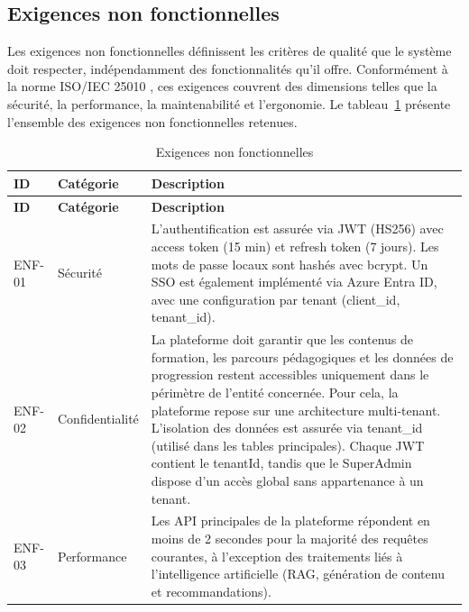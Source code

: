 \subsection{Exigences non fonctionnelles}

Les exigences non fonctionnelles définissent les critères de qualité que le système 
doit respecter, indépendamment des fonctionnalités qu'il offre. Conformément à la 
norme ISO/IEC 25010 \cite{iso25010}, ces exigences couvrent des dimensions telles 
que la sécurité, la performance, la maintenabilité et l'ergonomie. Le 
tableau~\ref{tab:enf} présente l'ensemble des exigences non fonctionnelles retenues.

\renewcommand{\arraystretch}{1.3}

\begin{longtable}{|p{1.2cm}|p{2.8cm}|p{11cm}|}

\caption{Exigences non fonctionnelles}
\label{tab:enf} \\

\hline
\textbf{ID} & \textbf{Catégorie} & \textbf{Description} \\
\hline
\endfirsthead

\hline
\textbf{ID} & \textbf{Catégorie} & \textbf{Description} \\
\hline
\endhead

ENF-01 & Sécurité & L'authentification est assurée via JWT (HS256) avec access token (15 min) et refresh token (7 jours). Les mots de passe locaux sont hashés avec bcrypt. Un SSO est également implémenté via Azure Entra ID, avec une configuration par tenant (client\_id, tenant\_id). \\
\hline

ENF-02 & Confidentialité & La plateforme doit garantir que les contenus de formation, les parcours pédagogiques et les données de progression restent accessibles uniquement dans le périmètre de l'entité concernée. Pour cela, la plateforme repose sur une architecture multi-tenant. L'isolation des données est assurée via tenant\_id (utilisé dans les tables principales). Chaque JWT contient le tenantId, tandis que le SuperAdmin dispose d'un accès global sans appartenance à un tenant. \\
\hline

ENF-03 & Performance & Les API principales de la plateforme répondent en moins de 2 secondes pour la majorité des requêtes courantes, à l'exception des traitements liés à l'intelligence artificielle (RAG, génération de contenu et recommandations). \\
\hline


\end{longtable}
